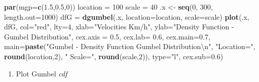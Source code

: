 \documentclass[12pt,oneside]{reedthesis}
\newenvironment{Shaded}{\begin{snugshade}}{\end{snugshade}}
\newcommand{\CharTok}[1]{\textcolor[rgb]{0.31,0.60,0.02}{#1}}
\newcommand{\DataTypeTok}[1]{\textcolor[rgb]{0.13,0.29,0.53}{#1}}
\newcommand{\DecValTok}[1]{\textcolor[rgb]{0.00,0.00,0.81}{#1}}
\newcommand{\FloatTok}[1]{\textcolor[rgb]{0.00,0.00,0.81}{#1}}
\newcommand{\KeywordTok}[1]{\textcolor[rgb]{0.13,0.29,0.53}{\textbf{#1}}}
\newcommand{\NormalTok}[1]{#1}
\newcommand{\StringTok}[1]{\textcolor[rgb]{0.31,0.60,0.02}{#1}}
\providecommand{\tightlist}{%
  \setlength{\itemsep}{0pt}\setlength{\parskip}{0pt}}
\begin{document}
\begin{Shaded}
\begin{Highlighting}[]
\KeywordTok{par}\NormalTok{(}\DataTypeTok{mgp=}\KeywordTok{c}\NormalTok{(}\FloatTok{1.5}\NormalTok{,}\FloatTok{0.5}\NormalTok{,}\DecValTok{0}\NormalTok{))}
\NormalTok{location =}\StringTok{ }\DecValTok{100}
\NormalTok{scale =}\StringTok{ }\DecValTok{40}
\NormalTok{.x <-}\StringTok{ }\KeywordTok{seq}\NormalTok{(}\DecValTok{0}\NormalTok{, }\DecValTok{300}\NormalTok{, }\DataTypeTok{length.out=}\DecValTok{1000}\NormalTok{)}
\NormalTok{dfG =}\StringTok{ }\KeywordTok{dgumbel}\NormalTok{(.x, }\DataTypeTok{location=}\NormalTok{location, }\DataTypeTok{scale=}\NormalTok{scale)}
\KeywordTok{plot}\NormalTok{(.x, dfG, }\DataTypeTok{col=}\StringTok{"red"}\NormalTok{, }\DataTypeTok{lty=}\DecValTok{4}\NormalTok{, }\DataTypeTok{xlab=}\StringTok{"Velocities Km/h"}\NormalTok{, }\DataTypeTok{ylab=}\StringTok{"Density Function - Gumbel Distribution"}\NormalTok{, }\DataTypeTok{cex.axis =} \FloatTok{0.5}\NormalTok{, }\DataTypeTok{cex.lab=} \FloatTok{0.6}\NormalTok{, }\DataTypeTok{cex.main=}\FloatTok{0.7}\NormalTok{,}
 \DataTypeTok{main=}\KeywordTok{paste}\NormalTok{(}\StringTok{"Gumbel - Density Function Gumbel Distribution}\CharTok{\textbackslash{}n}\StringTok{"}\NormalTok{, }\StringTok{"Location="}\NormalTok{, }\KeywordTok{round}\NormalTok{(location,}\DecValTok{2}\NormalTok{), }\StringTok{" Scale="}\NormalTok{, }\KeywordTok{round}\NormalTok{(scale,}\DecValTok{2}\NormalTok{)), }\DataTypeTok{type=}\StringTok{"l"}\NormalTok{, }\DataTypeTok{cex.sub=}\FloatTok{0.6}\NormalTok{)}
\end{Highlighting}
\end{Shaded}
\normalsize
\begin{enumerate}
\def\labelenumi{\arabic{enumi}.}
\setcounter{enumi}{2}
\tightlist
\item
  Plot Gumbel \emph{cdf}
\end{enumerate}
\tiny
\end{document}
